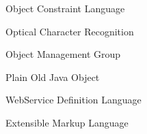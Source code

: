 \begin{acronym}
  {Object Constraint Language}
\end{acronym}

\begin{acronym}
  {Optical Character Recognition}
\end{acronym}

\begin{acronym}
  {Object Management Group}
\end{acronym}

\begin{acronym}
  {Plain Old Java Object}
\end{acronym}

\begin{acronym}
  {WebService Definition Language}
\end{acronym}

\begin{acronym}
  {Extensible Markup Language}
\end{acronym}